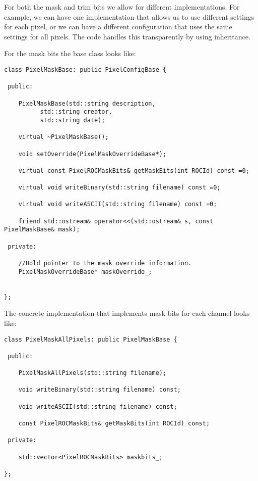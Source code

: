 For both the mask and trim bits we allow for different implementations.
For example, we can have one implementation that allows us
to use different settings for each pixel, or we can have a different
configuration that uses the same settings for all pixels. The code
handles this transparently by using inheritance. 

For the mask bits the base class looks like:

\begin{verbatim}
class PixelMaskBase: public PixelConfigBase {

 public:

    PixelMaskBase(std::string description, 
		  std::string creator,
		  std::string date);

    virtual ~PixelMaskBase();

    void setOverride(PixelMaskOverrideBase*);

    virtual const PixelROCMaskBits& getMaskBits(int ROCId) const =0;

    virtual void writeBinary(std::string filename) const =0;

    virtual void writeASCII(std::string filename) const =0;

    friend std::ostream& operator<<(std::ostream& s, const PixelMaskBase& mask);

 private:

    //Hold pointer to the mask override information.
    PixelMaskOverrideBase* maskOverride_;


};
\end{verbatim}

The concrete implementation that implements mask bits for each
channel looks like:

\begin{verbatim}
class PixelMaskAllPixels: public PixelMaskBase {

 public:

    PixelMaskAllPixels(std::string filename);

    void writeBinary(std::string filename) const;

    void writeASCII(std::string filename) const;

    const PixelROCMaskBits& getMaskBits(int ROCId) const;

 private:

    std::vector<PixelROCMaskBits> maskbits_;  
 
};

\end{verbatim}

